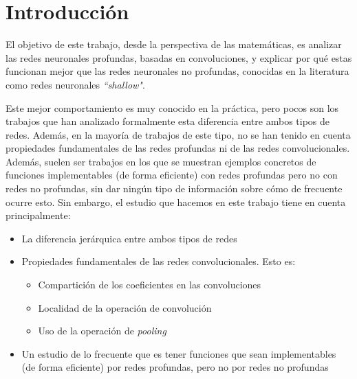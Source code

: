 
\chapter{Introducción}\label{ch:introduccion}

El objetivo de este trabajo, desde la perspectiva de las matemáticas, es analizar las redes neuronales profundas, basadas en convoluciones, y explicar por qué estas funcionan mejor que las redes neuronales no profundas, conocidas en la literatura como redes neuronales \textit{``shallow"}.

Este mejor comportamiento es muy conocido en la práctica, pero pocos son los trabajos que han analizado formalmente esta diferencia entre ambos tipos de redes. Además, en la mayoría de trabajos de este tipo, no se han tenido en cuenta propiedades fundamentales de las redes profundas ni de las redes convolucionales. Además, suelen ser trabajos en los que se muestran ejemplos concretos de funciones implementables (de forma eficiente) con redes profundas pero no con redes no profundas, sin dar ningún tipo de información sobre cómo de frecuente ocurre esto. Sin embargo, el estudio que hacemos en este trabajo tiene en cuenta principalmente:

\begin{itemize}
    \item La diferencia jerárquica entre ambos tipos de redes
    \item Propiedades fundamentales de las redes convolucionales. Esto es:
        \begin{itemize}
            \item Compartición de los coeficientes en las convoluciones
            \item Localidad de la operación de convolución
            \item Uso de la operación de \textit{pooling}
        \end{itemize}
    \item Un estudio de lo frecuente que es tener funciones que sean implementables (de forma eficiente) por redes profundas, pero no por redes no profundas
\end{itemize}

